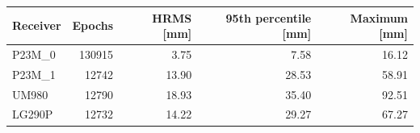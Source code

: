 \documentclass[11pt,a4paper]{article}
\numberwithin{equation}{section}
\numberwithin{figure}{section}
\begin{document}
\begin{center}\begin{lrbox}{\reporttable}\small\setlength{\tabcolsep}{4pt}\begin{tabular}{lrrrr}\toprule
Receiver & Epochs & HRMS [mm] & 95th percentile [mm] & Maximum [mm]\\\midrule
P23M\_0 & 130915 & 3.75 & 7.58 & 16.12\\
P23M\_1 & 12742 & 13.90 & 28.53 & 58.91\\
UM980 & 12790 & 18.93 & 35.40 & 92.51\\
LG290P & 12732 & 14.22 & 29.27 & 67.27\\
\bottomrule\end{tabular}\end{lrbox}\ifdim\wd\reporttable>\linewidth\resizebox{\linewidth}{!}{\usebox{\reporttable}}\else\usebox{\reporttable}\fi\end{center}
\end{document}

